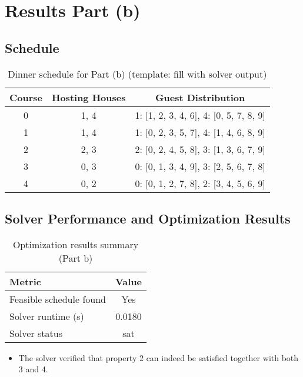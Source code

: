 \documentclass{article}
\begin{document}
\section{Results Part (b)}

\subsection{Schedule}
\begin{table}[H]
\centering
\caption{Dinner schedule for Part (b) (template: fill with solver output)}
\small
\begin{tabular}{c|c|c}
\toprule
Course & Hosting Houses & Guest Distribution \\
\midrule
0 & 1, 4 & 1: [1, 2, 3, 4, 6], 4: [0, 5, 7, 8, 9] \\
1 & 1, 4 & 1: [0, 2, 3, 5, 7], 4: [1, 4, 6, 8, 9] \\
2 & 2, 3 & 2: [0, 2, 4, 5, 8], 3: [1, 3, 6, 7, 9] \\
3 & 0, 3 & 0: [0, 1, 3, 4, 9], 3: [2, 5, 6, 7, 8] \\
4 & 0, 2 & 0: [0, 1, 2, 7, 8], 2: [3, 4, 5, 6, 9] \\
\bottomrule
\end{tabular}
\end{table}

\subsection{Solver Performance and Optimization Results}
\begin{table}[H]
\centering
\caption{Optimization results summary (Part b)}
\begin{tabular}{l c}
\toprule
Metric & Value \\
\midrule
Feasible schedule found & Yes \\
Solver runtime (s) & 0.0180 \\
Solver status & sat \\
\bottomrule
\end{tabular}
\end{table}

\begin{itemize}
    \item The solver verified that property 2 can indeed be satisfied together with both 3 and 4.
\end{itemize}
\end{document}
